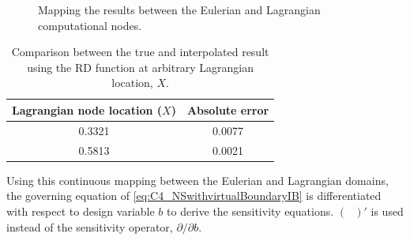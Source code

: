 \begin{figure}[H]
    \centering
    \quad
    \caption{Mapping the results between the Eulerian and Lagrangian computational nodes.}
    \label{fig:C4_euler2lagrangeExample}
\end{figure}

\begin{table}[H]
\centering
\begin{tabular}{| c | c |}
    \hline
    Lagrangian node location ($X$) & Absolute error \\ \hline \hline
    0.3321 & 0.0077 \\ \hline
    0.5813 & 0.0021 \\ \hline
\end{tabular}
\caption{Comparison between the true and interpolated result using the RD function at arbitrary Lagrangian location, $X$.}
\label{table:C4_euler2lagrangeExample}
\end{table}

Using this continuous mapping between the Eulerian and Lagrangian domains, the governing equation of \eqref{eq:C4_NSwithvirtualBoundaryIB} is differentiated with respect to design variable $b$ to derive the sensitivity equations. $(\text{ })'$ is used instead of the sensitivity operator, $\partial/\partial b$.

